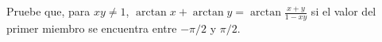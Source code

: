 \item Pruebe que, para $xy \ne 1$, $\arctan x + \arctan y = \arctan \frac{x+y}{1-xy}$ si el valor del primer miembro se encuentra entre $-\pi/2$ y $\pi/2$.

